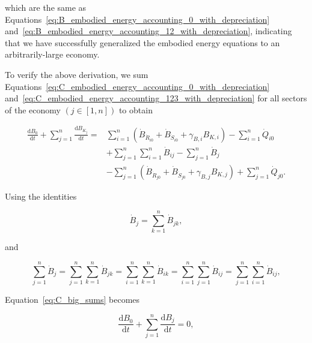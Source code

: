 \noindent which are the same as 
Equations~\ref{eq:B_embodied_energy_accounting_0_with_depreciation}
and~\ref{eq:B_embodied_energy_accounting_12_with_depreciation},
indicating that we have successfully generalized the embodied energy
equations to an arbitrarily-large economy.

To verify the above derivation, 
we sum 
Equations~\ref{eq:C_embodied_energy_accounting_0_with_depreciation} 
and~\ref{eq:C_embodied_energy_accounting_123_with_depreciation} 
for all sectors of the economy $\left( j \in [1,n] \right)$ to obtain

\begin{equation} \label{eq:C_big_sums}
	\begin{split}
		\frac{\mathrm{d}B_{0}}{\mathrm{d}t} 
		+ \sum\limits_{j=1}^n \frac{\mathrm{d}B_{K_{j}}}{\mathrm{d}t} 
		= & 
		 \sum\limits_{i=1}^n 
			\left( \dot{B}_{\dot{R}_{i0}} 
					+ \dot{B}_{\dot{S}_{i0}} 
					+ \gamma_{B,i} B_{K,i} \right)
		- \sum\limits_{i=1}^n \dot{Q}_{i0} \\
		& + \sum\limits_{j=1}^n \sum\limits_{i=1}^n \dot{B}_{ij}
		- \sum\limits_{j=1}^n \dot{B}_{j}	\\
		& - \sum\limits_{j=1}^n
				\left( \dot{B}_{\dot{R}_{j0}}
					+ \dot{B}_{\dot{S}_{j0}}
					+ \gamma_{B,j} B_{K,j} \right)
		+ \sum\limits_{j=1}^n \dot{Q}_{j0}.
	\end{split}
\end{equation}

\noindent{}Using the identities

\begin{equation} \label{eq:B_identity_1}
	\dot{B}_{j}  
	= \sum\limits_{k=1}^n \dot{B}_{jk},
\end{equation} 

\noindent{}and

\begin{equation} \label{eq:B_identity_2}
	\sum\limits_{j=1}^n\dot{B}_{j}  
	= \sum\limits_{j=1}^n \sum\limits_{k=1}^n \dot{B}_{jk}
	= \sum\limits_{i=1}^n \sum\limits_{k=1}^n \dot{B}_{ik}
	= \sum\limits_{i=1}^n \sum\limits_{j=1}^n \dot{B}_{ij}
	= \sum\limits_{j=1}^n \sum\limits_{i=1}^n \dot{B}_{ij},
\end{equation}

\noindent{}Equation~\ref{eq:C_big_sums} becomes

\begin{equation} \label{eq:C-B_sums_to_zero}
	\frac{\mathrm{d}B_{0}}{\mathrm{d}t} 
	+ \sum\limits_{j=1}^n \frac{\mathrm{d}B_{j}}{\mathrm{d}t} 
	= 0,
\end{equation}

